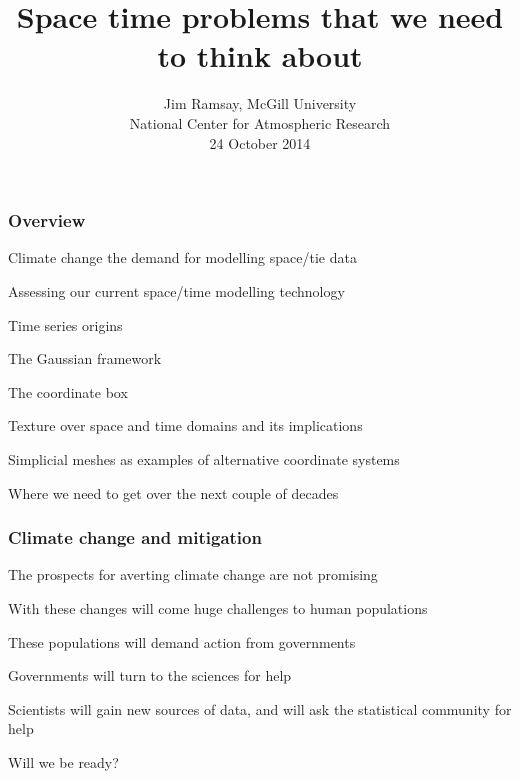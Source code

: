 \documentclass[11pt]{beamer}
\title{Space time problems that we need to think about}
\author{Jim Ramsay, McGill University   \\
      National Center for Atmospheric Research \\
      24 October 2014}
\date{}
\begin{document}

\begin{frame}

\maketitle

\end{frame}


\begin{frame}

\frametitle{Overview}

\bi
  \item Climate change the demand for modelling space/tie data
  \item Assessing our current space/time modelling technology
  \bi
    \item Time series origins
    \item The Gaussian framework
    \item The coordinate box
  \ei
  \item Texture over space and time domains and its implications
  \item Simplicial meshes as examples of alternative coordinate systems
  \item Where we need to get over the next couple of decades
\ei

\end{frame}


\begin{frame}

\frametitle{Climate change and mitigation}

\bi
  \item The prospects for averting climate change are not promising
  \item With these changes will come huge challenges to human populations
  \item These populations will demand action from governments
  \item Governments will turn to the sciences for help
  \item Scientists will gain new sources of data, and will ask the 
  statistical community for help
  \item Will we be ready?
\ei

\end{frame}
\end{document}
